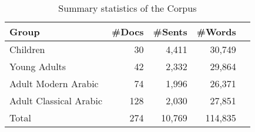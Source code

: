 \begin{table}
\centering
\setlength{\tabcolsep}{2pt}
\begin{tabular}{|l|r|r|r|l|}
\hline
\textbf{Group} &\textbf{\#Docs} &\textbf{\#Sents} &\textbf{\#Words} \\
\hline
Children &30 &4,411 &30,749  \\
Young Adults &42 &2,332 &29,864  \\
Adult Modern Arabic &74 &1,996 &26,371  \\
Adult Classical Arabic &128 &2,030 &27,851\\
\hline
Total &274 &10,769 &114,835 \\
\hline
\end{tabular}
\caption{Summary statistics of the {\barec} Corpus}
\label{tab:dataset}
\end{table}

